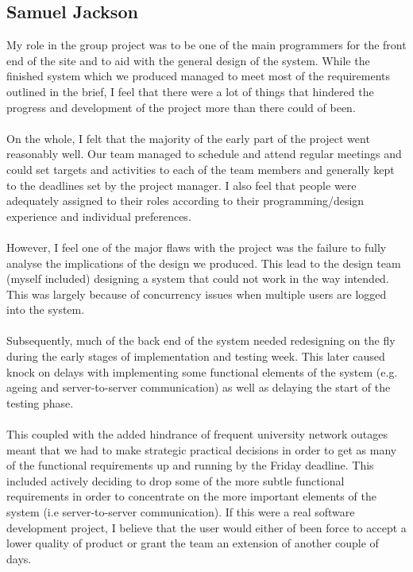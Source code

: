 \documentclass{project}
\begin{document}
\subsection{Samuel Jackson}
My role in the group project was to be one of the main programmers for the front end of the site and to aid with the general design of the system. While the finished system which we produced managed to meet most of the requirements outlined in the brief, I feel that there were a lot of things that hindered the progress and development of the project more than there could of been.
\\\\
On the whole, I felt that the majority of the early part of the project went reasonably well. Our team managed to schedule and attend regular meetings and could set targets and activities to each of the team members and generally kept to the deadlines set by the project manager. I also feel that people were adequately assigned to their roles according to their programming/design experience and individual preferences.
\\\\
However, I feel one of the major flaws with the project was the failure to fully analyse the implications of the design we produced. This lead to the design team (myself included) designing a system that could not work in the way intended. This was largely because of concurrency issues when multiple users are logged into the system.
\\\\
Subsequently, much of the back end of the system needed redesigning on the fly during the early stages of implementation and testing week. This later caused knock on delays with implementing some functional elements of the system (e.g. ageing and server-to-server communication) as well as delaying the start of the testing phase.
\\\\
This coupled with the added hindrance of frequent university network outages meant that we had to make strategic practical decisions in order to get as many of the functional requirements up and running by the Friday deadline. This included actively deciding to drop some of the more subtle functional requirements in order to concentrate on the more important elements of the system (i.e server-to-server communication). If this were a real software development project, I believe that the user would either of been force to accept a lower quality of product or grant the team an extension of another couple of days.
\end{document}
